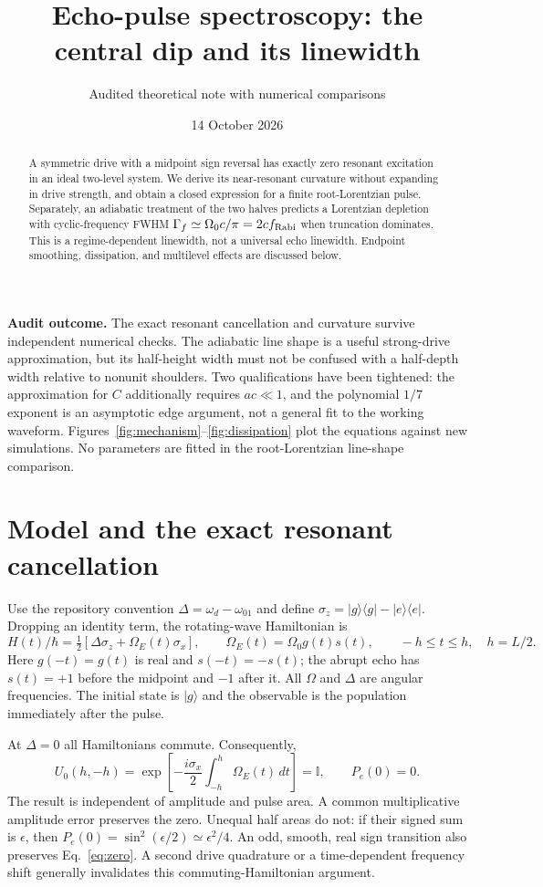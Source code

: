 \documentclass[11pt]{article}
\title{Echo-pulse spectroscopy: the central dip and its linewidth}
\author{Audited theoretical note with numerical comparisons}
\date{14 October 2026}
\newcommand{\Pe}{P_e}
\newcommand{\Om}{\Omega}
\begin{document}
\maketitle

\begin{abstract}
A symmetric drive with a midpoint sign reversal has exactly zero resonant
excitation in an ideal two-level system. We derive its near-resonant curvature
without expanding in drive strength, and obtain a closed expression for a
finite root-Lorentzian pulse. Separately, an adiabatic treatment of the two
halves predicts a Lorentzian depletion with cyclic-frequency FWHM
$\Gamma_f\simeq\Om_0c/\pi=2c f_{\rm Rabi}$ when truncation dominates.
This is a regime-dependent linewidth, not a universal echo linewidth.
Endpoint smoothing, dissipation, and multilevel effects are discussed below.
\end{abstract}

\noindent\textbf{Audit outcome.} The exact resonant cancellation and curvature
survive independent numerical checks. The adiabatic line shape is a useful
strong-drive approximation, but its half-height width must not be confused
with a half-depth width relative to nonunit shoulders. Two qualifications
have been tightened: the approximation for $C$ additionally requires
$ac\ll1$, and the polynomial $1/7$ exponent is an asymptotic edge argument,
not a general fit to the working waveform. Figures~\ref{fig:mechanism}--\ref{fig:dissipation}
plot the equations against new simulations. No parameters are fitted in the
root-Lorentzian line-shape comparison.

\section{Model and the exact resonant cancellation}
Use the repository convention $\Delta=\omega_d-\omega_{01}$ and define
$\sigma_z=|g\rangle\langle g|-|e\rangle\langle e|$. Dropping an identity
term, the rotating-wave Hamiltonian is
\begin{equation}
 H(t)/\hbar=\tfrac12[\Delta\sigma_z+\Om_E(t)\sigma_x],\qquad
 \Om_E(t)=\Om_0 g(t)s(t),\qquad -h\le t\le h,\quad h=L/2.
 \label{eq:model}
\end{equation}
Here $g(-t)=g(t)$ is real and $s(-t)=-s(t)$; the abrupt echo has
$s(t)=+1$ before the midpoint and $-1$ after it. All $\Om$ and $\Delta$
are angular frequencies. The initial state is $|g\rangle$ and the observable
is the population immediately after the pulse.

At $\Delta=0$ all Hamiltonians commute. Consequently,
\begin{equation}
 U_0(h,-h)=\exp\left[-\frac{i\sigma_x}{2}
 \int_{-h}^{h}\Om_E(t)\,dt\right]=\mathbb I,
 \qquad \boxed{\Pe(0)=0.}
 \label{eq:zero}
\end{equation}
The result is independent of amplitude and pulse area. A common multiplicative
amplitude error preserves the zero. Unequal half areas do not: if their signed
sum is $\epsilon$, then $\Pe(0)=\sin^2(\epsilon/2)\simeq\epsilon^2/4$.
An odd, smooth, real sign transition also preserves Eq.~\eqref{eq:zero}.
A second drive quadrature or a time-dependent frequency shift generally
invalidates this commuting-Hamiltonian argument.
\end{document}
